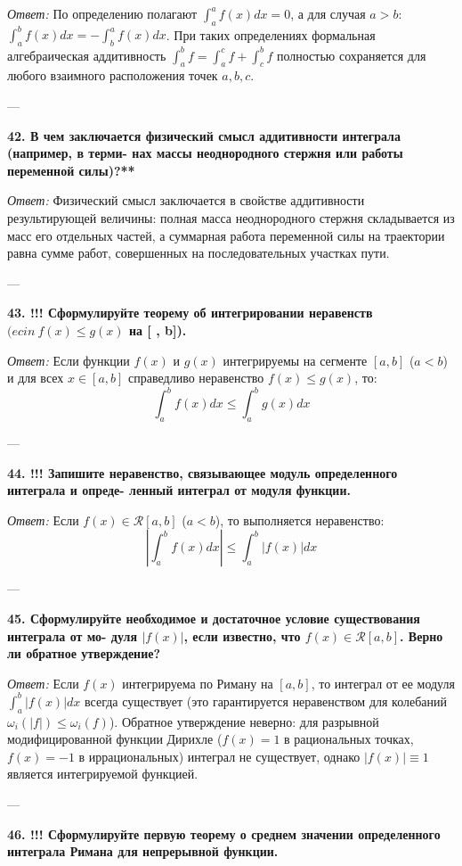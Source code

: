 \documentclass{article}
\begin{document}
\textit{Ответ:} По определению полагают $\int_a^a f(x) dx = 0$, а для случая $a > b$: $\int_a^b f(x) dx = -\int_b^a f(x) dx$. При таких определениях формальная алгебраическая аддитивность $\int_a^b f = \int_a^c f + \int_c^b f$ полностью сохраняется для любого взаимного расположения точек $a, b, c$.

---

\textbf{42. В чем заключается физический смысл аддитивности интеграла (например, в терми- нах массы неоднородного стержня или работы переменной силы)?**}

\textit{Ответ:} Физический смысл заключается в свойстве аддитивности результирующей величины: полная масса неоднородного стержня складывается из масс его отдельных частей, а суммарная работа переменной силы на траектории равна сумме работ, совершенных на последовательных участках пути.

---

\textbf{43. !!! Сформулируйте теорему об интегрировании неравенств $(ecin~f(x)\le g(x)$ на [ , b]).}

\textit{Ответ:} Если функции $f(x)$ и $g(x)$ интегрируемы на сегменте $[a, b]$ ($a < b$) и для всех $x \in [a, b]$ справедливо неравенство $f(x) \le g(x)$, то:
$$ \int_a^b f(x) dx \le \int_a^b g(x) dx $$

---

\textbf{44. !!! Запишите неравенство, связывающее модуль определенного интеграла и опреде- ленный интеграл от модуля функции.}

\textit{Ответ:} Если $f(x) \in \mathcal{R}[a, b]$ ($a < b$), то выполняется неравенство:
$$ \left| \int_a^b f(x) dx \right| \le \int_a^b |f(x)| dx $$

---

\textbf{45. Сформулируйте необходимое и достаточное условие существования интеграла от мо- дуля $|f(x)|$, если известно, что $f(x)\in\mathcal{R}[a,b]$. Верно ли обратное утверждение?}

\textit{Ответ:} Если $f(x)$ интегрируема по Риману на $[a, b]$, то интеграл от ее модуля $\int_a^b |f(x)| dx$ всегда существует (это гарантируется неравенством для колебаний $\omega_i(|f|) \le \omega_i(f)$). Обратное утверждение неверно: для разрывной модифицированной функции Дирихле ($f(x) = 1$ в рациональных точках, $f(x) = -1$ в иррациональных) интеграл не существует, однако $|f(x)| \equiv 1$ является интегрируемой функцией.

---

\textbf{46. !!! Сформулируйте первую теорему о среднем значении определенного интеграла Римана для непрерывной функции.}
\end{document}
